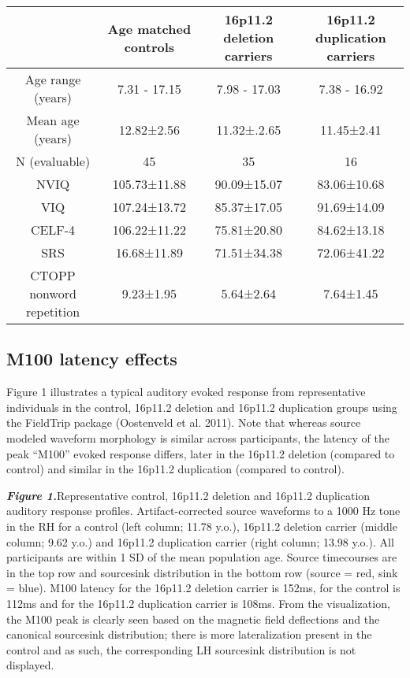 \documentclass{article}
\begin{document}
\bigskip


\begin{tabular}{|c|c|c|c|}
\hline
 & Age matched controls	& 16p11.2 deletion carriers	& 16p11.2 duplication carriers\\
\hline
Age range (years) &	7.31 - 17.15	& 7.98 - 17.03 &	7.38 - 16.92\\
\hline
Mean age (years) &	12.82±2.56 &	11.32±.2.65 &	11.45±2.41\\
\hline
N (evaluable) &	45 &	35 &	16\\
\hline
NVIQ&	105.73±11.88 &	90.09±15.07 &	83.06±10.68\\
\hline
VIQ&	107.24±13.72 &	85.37±17.05 &	91.69±14.09\\
\hline
CELF-4&	106.22±11.22 &	75.81±20.80 &	84.62±13.18\\
\hline
SRS&	16.68±11.89 &	71.51±34.38 &	72.06±41.22\\
\hline
CTOPP nonword repetition &	9.23±1.95 &	5.64±2.64 &	7.64±1.45\\
\hline
\end{tabular}

\subsection*{M100 latency effects}
Figure 1 illustrates a typical auditory evoked response from representative individuals in the control, 16p11.2 deletion and 16p11.2 duplication groups using the FieldTrip package (Oostenveld et al. 2011). Note that whereas source modeled waveform morphology is similar across participants, the latency of the peak “M100” evoked response differs, later in the 16p11.2 deletion (compared to control) and similar in the 16p11.2 duplication (compared to control).  

\bigskip

\textbf{\emph{Figure 1.}}Representative control, 16p11.2 deletion and 16p11.2 duplication auditory response profiles. Artifact-corrected source waveforms to a 1000 Hz tone in the RH for a control (left column; 11.78 y.o.), 16p11.2 deletion carrier (middle column; 9.62 y.o.) and 16p11.2 duplication carrier (right column; 13.98 y.o.). All participants are within 1 SD of the mean population age.  Source timecourses are in the top row and source\-sink distribution in the bottom row (source = red, sink = blue). M100 latency for the 16p11.2 deletion carrier is 152ms, for the control is 112ms and for the 16p11.2 duplication carrier is 108ms. From the visualization, the M100 peak is clearly seen based on the magnetic field deflections and the canonical source\-sink distribution; there is more lateralization present in the control and as such, the corresponding LH source\-sink distribution is not displayed.
\end{document}
